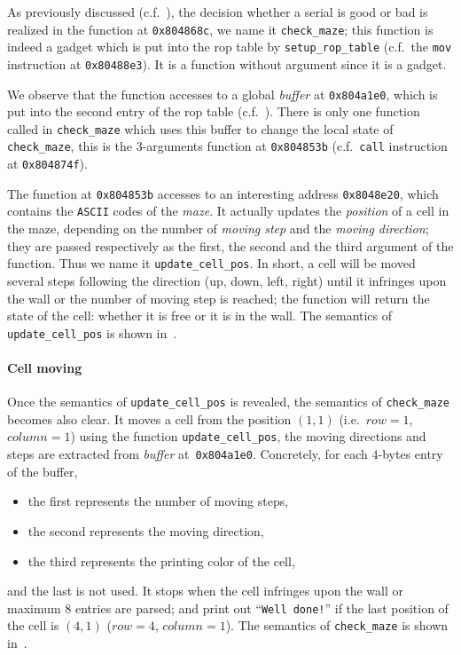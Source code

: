 \documentclass{easychair}
\begin{document}
As previously discussed (c.f.~), the decision whether a serial is good or bad is realized in the function at \texttt{0x804868c}, we name it \texttt{check\_maze}; this function is indeed a gadget which is put into the rop table by \texttt{setup\_rop\_table} (c.f.~the \texttt{mov} instruction at \texttt{0x80488e3}). It is a function without argument since it is a gadget.

We observe that the function accesses to a global \emph{buffer} at \texttt{0x804a1e0}, which is put into the second entry of the rop table (c.f.~). There is only one function called in \texttt{check\_maze} which uses this buffer to change the local state of \texttt{check\_maze}, this is the $3$-arguments function at \texttt{0x804853b} (c.f.~\texttt{call} instruction at \texttt{0x804874f}).

The function at \texttt{0x804853b} accesses to an interesting address \texttt{0x8048e20}, which contains the \texttt{ASCII} codes of the \emph{maze}. It actually updates the \emph{position} of a cell in the maze, depending on the number of \emph{moving step}  and the \emph{moving direction}; they are passed respectively as the first, the second and the third argument of the function. Thus we name it \texttt{update\_cell\_pos}. In short, a cell will be moved several steps following the direction (up, down, left, right) until it infringes upon the wall or the number of moving step is reached; the function will return the state of the cell: whether it is free or it is in the wall. The semantics of \texttt{update\_cell\_pos} is shown in~.

\paragraph{Cell moving}
Once the semantics of \texttt{update\_cell\_pos} is revealed, the semantics of \texttt{check\_maze} becomes also clear. It moves a cell from the position $(1, 1)$ (i.e.~$row = 1$, $column = 1$) using the function \texttt{update\_cell\_pos}, the moving directions and steps are extracted from \emph{buffer} at~\texttt{0x804a1e0}. Concretely, for each $4$-bytes entry of the buffer, 
\begin{itemize}
\item the first represents the number of moving steps,
\item the second represents the moving direction,
\item the third represents the printing color of the cell,
\end{itemize}
and the last is not used. It stops when the cell infringes upon the wall or maximum $8$ entries are parsed; and print out ``\texttt{Well done!}'' if the last position of the cell is $(4, 1)$ ($row = 4$, $column = 1$). The semantics of \texttt{check\_maze} is shown in~.
\end{document}
